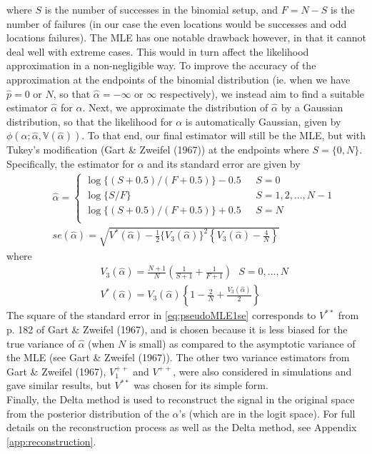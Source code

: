 \documentclass[12pt]{article}
\newcommand{\Ga}{\alpha}
\begin{document}
where $S$ is the number of successes in the binomial setup, and $F=N-S$ is the number of failures (in our case the even locations would be successes and odd locations failures). The MLE has one notable drawback however, in that it cannot deal well with extreme cases. This would in turn affect the likelihood approximation in a non-negligible way. To improve the accuracy of the approximation at the endpoints of the binomial distribution (ie. when we have $\hat{p}=0$ or $N$, so that $\hat{\Ga}=-\infty$ or $\infty$ respectively), we instead aim to find a suitable estimator $\hat{\Ga}$ for $\Ga$. Next, we approximate the distribution of $\hat{\Ga}$ by a Gaussian distribution, so that the likelihood for $\Ga$ is automatically Gaussian, given by $\phi(\Ga;\hat{\Ga},\mathbb{V}(\hat{\Ga}))$. To that end, our final estimator will still be the MLE, but with Tukey's modification (Gart \& Zweifel (1967)) at the endpoints where $S=\{0,N\}$. Specifically, the estimator for $\Ga$ and its standard error are given by
\begin{eqnarray}\label{eq:pseudoMLE1}
&&\hat{\Ga}=\left\{
\begin{array}{lll}
\log\{(S+0.5)/(F+0.5)\}-0.5&\ \ \ S=0\\
\log\{S/F\}&\ \ \ S=1,2,...,N-1\\
\log\{(S+0.5)/(F+0.5)\}+0.5&\ \ \ S=N\\
\end{array}
\right.\\ \label{eq:pseudoMLE1se}
&&se(\hat{\Ga})=\sqrt{V^*(\hat{\Ga})-\frac{1}{2}\{V_3(\hat{\Ga})\}^2\left\{V_3(\hat{\Ga})-\frac{4}{N}\right\}}
\end{eqnarray}
where
\begin{eqnarray}
&&V_3(\hat{\Ga})=\frac{N+1}{N}\left(\frac{1}{S+1}+\frac{1}{F+1}\right)\ \ \ S=0,...,N\\
\label{eq:pseudoMLE2}&&V^*(\hat{\Ga})=V_3(\hat{\Ga})\left\{1-\frac{2}{N}+\frac{V_3(\hat{\Ga})}{2}\right\}
\end{eqnarray}
The square of the standard error in \eqref{eq:pseudoMLE1se} corresponds to $V^{\ast\ast}$ from p. 182 of Gart \& Zweifel (1967), and is chosen because it is less biased for the true variance of $\hat{\Ga}$ (when $N$ is small) as compared to the asymptotic variance of the MLE (see Gart \& Zweifel (1967)). The other two variance estimators from Gart \& Zweifel (1967), $V_1^{++}$ and $V^{++}$, were also considered in simulations and gave similar results, but $V^{\ast\ast}$ was chosen for its simple form.\bigskip\\
Finally, the Delta method is used to reconstruct the signal in the original space from the posterior distribution of the $\Ga$'s (which are in the logit space). For full details on the reconstruction process as well as the Delta method, see Appendix \ref{app:reconstruction}.
\end{document}
